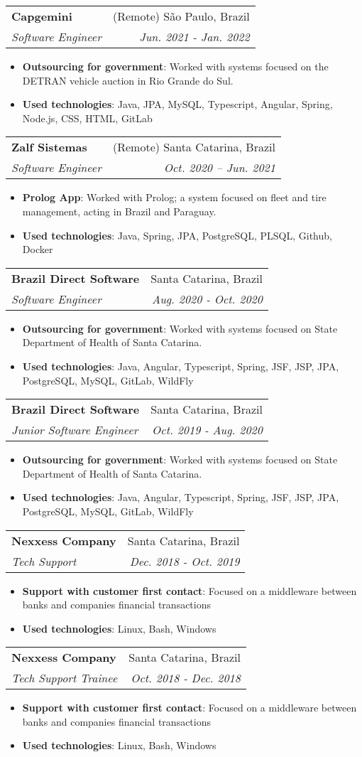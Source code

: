 \documentclass[letterpaper,11pt]{article}
\makeatletter
\newcommand{\resumeItem}[2]{
  \item\small{
    \textbf{#1}{: #2 \vspace{-2pt}}
  }
}
\newcommand{\resumeSubheading}[4]{
  \vspace{-1pt}\item
    \begin{tabular*}{0.97\textwidth}{l@{\extracolsep{\fill}}r}
      \textbf{#1} & #2 \\
      \textit{\small#3} & \textit{\small #4} \\
    \end{tabular*}\vspace{-5pt}
}
\newcommand{\resumeItemListStart}{\begin{itemize}}
\newcommand{\resumeItemListEnd}{\end{itemize}\vspace{-5pt}}
\makeatother
\begin{document}
    \resumeSubheading
      {Capgemini}{(Remote) São Paulo, Brazil}
      {Software Engineer}{Jun. 2021 - Jan. 2022}
      \resumeItemListStart
        \resumeItem{Outsourcing for government}
                   {Worked with systems focused on the DETRAN vehicle auction in Rio Grande do Sul.}
        \resumeItem{Used technologies}
          {Java, JPA, MySQL, Typescript, Angular, Spring, Node.js, CSS, HTML, GitLab}
              \resumeItemListEnd

    \resumeSubheading
      {Zalf Sistemas}{(Remote) Santa Catarina, Brazil}
      {Software Engineer}{Oct. 2020 -- Jun. 2021}
      \resumeItemListStart
        \resumeItem{Prolog App}
                   {Worked with Prolog; a system focused on fleet and tire management, acting in Brazil and Paraguay.}
        \vspace{-4mm}
        \resumeItem{Used technologies}
          {Java, Spring, JPA, PostgreSQL, PLSQL, Github, Docker}
      \resumeItemListEnd

      \resumeSubheading
      {Brazil Direct Software}{Santa Catarina, Brazil}
      {Software Engineer}{Aug. 2020 - Oct. 2020}
      \resumeItemListStart
      \resumeItem{Outsourcing for government}
                 {Worked with systems focused on State Department of Health of Santa Catarina.}
      \resumeItem{Used technologies}
                 {Java, Angular, Typescript, Spring, JSF, JSP, JPA, PostgreSQL, MySQL, GitLab, WildFly}
     \resumeItemListEnd
     \resumeSubheading
         {Brazil Direct Software}{Santa Catarina, Brazil}
         {Junior Software Engineer}{Oct. 2019 - Aug. 2020}
         \resumeItemListStart
         \resumeItem{Outsourcing for government}
                    {Worked with systems focused on State Department of Health of Santa Catarina.}
         \resumeItem{Used technologies}
                    {Java, Angular, Typescript, Spring, JSF, JSP, JPA, PostgreSQL, MySQL, GitLab, WildFly}
         \resumeItemListEnd
     \resumeSubheading
        {Nexxess Company}{Santa Catarina, Brazil}
        {Tech Support}{Dec. 2018 - Oct. 2019}
     \resumeItemListStart
     \resumeItem{Support with customer first contact}
                {Focused on a middleware between banks and companies financial transactions}
     \resumeItem{Used technologies}
                {Linux, Bash, Windows}
     \resumeItemListEnd
     \resumeSubheading
         {Nexxess Company}{Santa Catarina, Brazil}
         {Tech Support Trainee}{Oct. 2018 - Dec. 2018}
         \resumeItemListStart
         \resumeItem{Support with customer first contact}
                    {Focused on a middleware between banks and companies financial transactions}
                    \resumeItem{Used technologies}
                               {Linux, Bash, Windows}
                               \resumeItemListEnd
\end{document}
